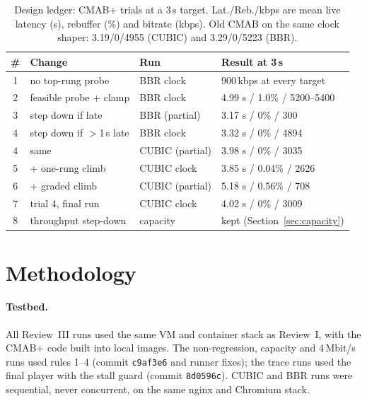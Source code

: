 \documentclass[sigconf]{acmart}
\newcommand{\cmabp}{CMAB+\xspace}
\newcommand{\kbps}{\,kbps\xspace}
\begin{document}
\begin{table}[t]
\caption{Design ledger: CMAB+ trials at a 3\,s target. Lat./Reb./kbps are mean live latency (s), rebuffer (\%) and bitrate (kbps). Old CMAB on the same clock shaper: 3.19/0/4955 (CUBIC) and 3.29/0/5223 (BBR).}
\label{tab:trials}
\footnotesize
\begin{tabular}{@{}clll@{}}
\toprule
\# & Change & Run & Result at 3\,s \\
\midrule
1 & no top-rung probe & BBR clock & 900\kbps at every target \\
2 & feasible probe + clamp & BBR clock & 4.99 s / 1.0\% / 5200--5400 \\
3 & step down if late & BBR (partial) & 3.17 s / 0\% / 300 \\
4 & step down if $>$1\,s late & BBR clock & 3.32 s / 0\% / 4894 \\
4 & same & CUBIC (partial) & 3.98 s / 0\% / 3035 \\
5 & + one-rung climb & CUBIC clock & 3.85 s / 0.04\% / 2626 \\
6 & + graded climb & CUBIC (partial) & 5.18 s / 0.56\% / 708 \\
7 & trial 4, final run & CUBIC clock & 4.02 s / 0\% / 3009 \\
8 & throughput step-down & capacity & kept (Section~\ref{sec:capacity}) \\
\bottomrule
\end{tabular}
\end{table}

\section{Methodology}
\label{sec:method}

\paragraph{Testbed.} All Review~III runs used the same VM and container stack as Review~I, with the \cmabp code built into local images. The non-regression, capacity and 4\,Mbit/s runs used rules 1--4 (commit \texttt{c9af3e6} and runner fixes); the trace runs used the final player with the stall guard (commit \texttt{8d0596c}). CUBIC and BBR runs were sequential, never concurrent, on the same nginx and Chromium stack.
\end{document}
